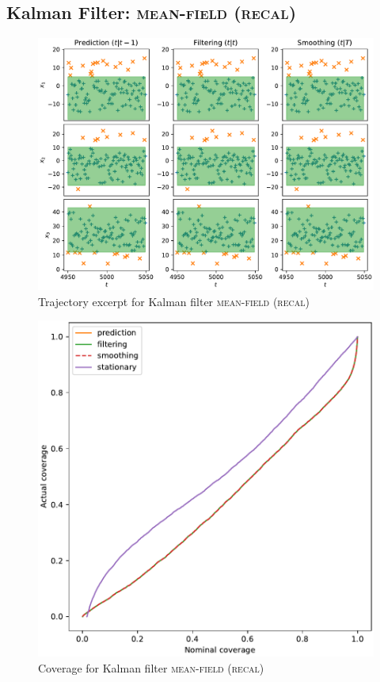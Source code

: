 \subsection{Kalman Filter: {\textsc{mean-field (recal)}}}
\begin{figure}[H]
\begin{center}
\includegraphics[width=\linewidth]{generated/trajectory/Method.MEAN_FIELD-Recalibrate.YES.pdf}
\end{center}
\caption{Trajectory excerpt for Kalman filter \textsc{{\textsc{mean-field (recal)}}}}
\end{figure}
\begin{figure}[H]
\begin{center}
\includegraphics[width=\linewidth]{generated/coverage/Method.MEAN_FIELD-Recalibrate.YES.pdf}
\end{center}
\caption{Coverage for Kalman filter \textsc{{\textsc{mean-field (recal)}}}}
\end{figure}
